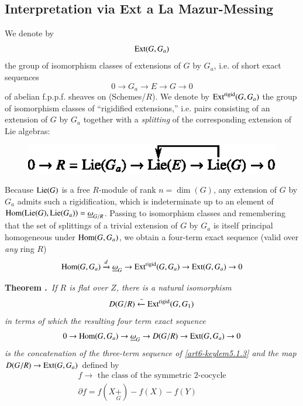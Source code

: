 \subsection{Interpretation via Ext a La Mazur-Messing}\label{art6-sec5.2}
We denote by 
$$
\operatorname{Ext}(G,G_{a})
$$ 
the group of isomorphism classes of extensions of $G$ by $G_{a}$, i.e. of short exact sequences
$$
0\to G_{a}\to E\to G\to 0
$$
of abelian f.p.p.f. sheaves on (Schemes/$R$). We denote by $\operatorname{Ext}^{\text{rigid}}(G,G_{a})$ the group of isomorphism classes of ``rigidified extensions,'' i.e. pairs consisting of an extension of $G$ by $G_{a}$ together with a {\em splitting} of the corresponding extension of Lie algebras:
\begin{figure}[H]
\centering
\includegraphics[scale=1.05]{chap6/fig6.eps}
\end{figure}
Because $\operatorname{Lie}(G)$ is a free $R$-module of rank $n=\dim (G)$, any extension of $G$ by $G_{a}$ admits such a rigidification, which is indeterminate up to an element of $\operatorname{Hom}(\operatorname{Lie}(G),\operatorname{Lie}(G_{a}))=\underline{\omega}_{G/R}$. Passing to isomorphism classes and remembering that the set of splittings of a trivial extension of $G$ by $G_{a}$ is itself principal homogeneous under $\operatorname{Hom}(G,G_{a})$, we obtain a four-term exact sequence (valid over {\em any} ring $R$)
$$
\operatorname{Hom}(G,G_{a})\xrightarrow{d}\underline{\omega}_{G}\to \operatorname{Ext}^{\text{rigid}}(G,G_{a})\to \operatorname{Ext}(G,G_{a})\to 0
$$


\smallskip
\noindent
{\bf Theorem .\label{art6-thm5.2.1}}~{\em If $R$ is flat over $Z$, there is a natural isomorphism}
$$
D(G/R)\xleftarrow{\sim}\operatorname{Ext}^{\text{rigid}}(G,G_{1})
$$
{\em in terms of which the resulting four term exact sequence}
$$
0\to \operatorname{Hom}(G,G_{a})\to \underline{\omega}_{G}\to D(G/R)\to \operatorname{Ext}(G,G_{a})\to 0
$$
{\em is the concatenation of the three-term sequence of \eqref{art6-keylem5.1.3} and the map} $D(G/R)\to \operatorname{Ext}(G,G_{a})$ defined by
\begin{gather*}
f\to \text{~the class of the symmetric 2-cocycle}\\[3pt]
\partial f=f(X{\displaystyle{\mathop{+}\limits_{G}}})-f(X)-f(Y)
\end{gather*}


